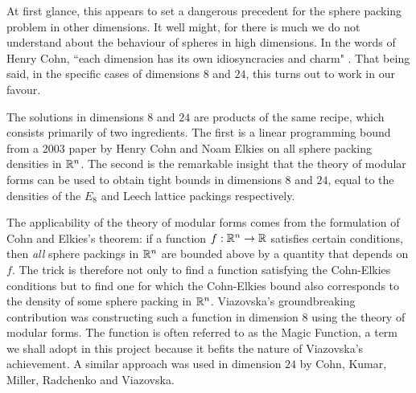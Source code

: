 At first glance, this appears to set a dangerous precedent for the sphere packing problem in other dimensions. It well might, for there is much we do not understand about the behaviour of spheres in high dimensions. In the words of Henry Cohn, ``each dimension has its own idiosyncracies and charm" \cite{CohnOnViazovskaAMS}. That being said, in the specific cases of dimensions $8$ and $24$, this turns out to work in our favour.

The solutions in dimensions $8$ and $24$ are products of the same recipe, which consists primarily of two ingredients. The first is a linear programming bound from a 2003 paper by Henry Cohn and Noam Elkies \cite[Theorem 3.1]{CohnElkies} on all sphere packing densities in $\mathbb{R}^n$. The second is the remarkable insight that the theory of modular forms can be used to obtain tight bounds in dimensions $8$ and $24$, equal to the densities of the $E_8$ and Leech lattice packings respectively.

The applicability of the theory of modular forms comes from the formulation of Cohn and Elkies's theorem: if a function $f : \mathbb{R}^n \to \mathbb{R}$ satisfies certain conditions, then \textit{all} sphere packings in $\mathbb{R}^n$ are bounded above by a quantity that depends on $f$. The trick is therefore not only to find a function satisfying the Cohn-Elkies conditions but to find one for which the Cohn-Elkies bound also corresponds to the density of some sphere packing in $\mathbb{R}^n$. Viazovska's groundbreaking contribution was constructing such a function in dimension $8$ using the theory of modular forms. The function is often referred to as the Magic Function, a term we shall adopt in this project because it befits the nature of Viazovska's achievement. A similar approach was used in dimension $24$ by Cohn, Kumar, Miller, Radchenko and Viazovska.